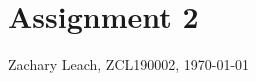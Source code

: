 \documentclass[twoside,12pt,a4paper,english]{memoir}
\begin{document}
\chapter{Assignment 2}
Zachary Leach, ZCL190002, \today
 



 

\end{document}
